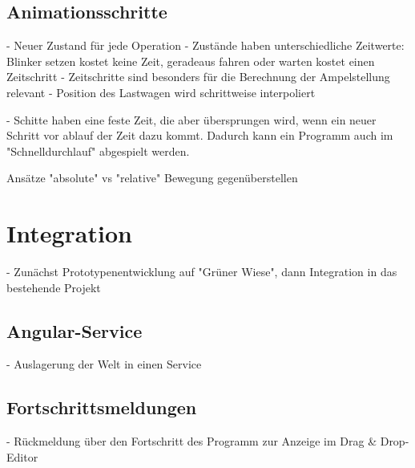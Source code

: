 \subsection{Animationsschritte}

- Neuer Zustand für jede Operation
- Zustände haben unterschiedliche Zeitwerte: Blinker setzen kostet keine Zeit,
  geradeaus fahren oder warten kostet einen Zeitschritt
- Zeitschritte sind besonders für die Berechnung der Ampelstellung relevant
- Position des Lastwagen wird schrittweise interpoliert

- Schitte haben eine feste Zeit, die aber übersprungen wird, wenn ein neuer
  Schritt vor ablauf der Zeit dazu kommt. Dadurch kann ein Programm auch im
  "Schnelldurchlauf" abgespielt werden.

Ansätze "absolute" vs "relative" Bewegung gegenüberstellen

\section{Integration}

- Zunächst Prototypenentwicklung auf "Grüner Wiese", dann Integration in das
  bestehende Projekt

\subsection{Angular-Service}

- Auslagerung der Welt in einen Service

\subsection{Fortschrittsmeldungen}

- Rückmeldung über den Fortschritt des Programm zur Anzeige im Drag \& Drop-Editor
